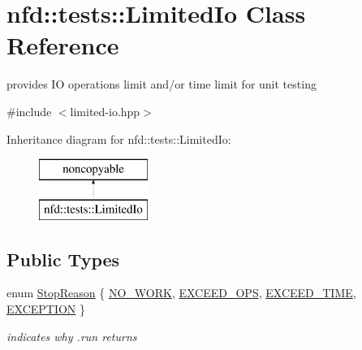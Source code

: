 \hypertarget{classnfd_1_1tests_1_1LimitedIo}{}\section{nfd\+:\+:tests\+:\+:Limited\+Io Class Reference}
\label{classnfd_1_1tests_1_1LimitedIo}


provides IO operations limit and/or time limit for unit testing  




{\ttfamily \#include $<$limited-\/io.\+hpp$>$}

Inheritance diagram for nfd\+:\+:tests\+:\+:Limited\+Io\+:\begin{figure}[H]
\begin{center}
\leavevmode
\includegraphics[height=2.000000cm]{classnfd_1_1tests_1_1LimitedIo}
\end{center}
\end{figure}
\subsection*{Public Types}
\begin{DoxyCompactItemize}
\item 
enum \hyperlink{classnfd_1_1tests_1_1LimitedIo_adbe63f8389fb55a9267d5291c48319c3}{Stop\+Reason} \{ \hyperlink{classnfd_1_1tests_1_1LimitedIo_adbe63f8389fb55a9267d5291c48319c3adba390cf6fd1660870ce5190a7aaf610}{N\+O\+\_\+\+W\+O\+RK}, 
\hyperlink{classnfd_1_1tests_1_1LimitedIo_adbe63f8389fb55a9267d5291c48319c3a8711760959e8bda432c512032054012c}{E\+X\+C\+E\+E\+D\+\_\+\+O\+PS}, 
\hyperlink{classnfd_1_1tests_1_1LimitedIo_adbe63f8389fb55a9267d5291c48319c3ab46a7a46c20f25a2980a518c070f526a}{E\+X\+C\+E\+E\+D\+\_\+\+T\+I\+ME}, 
\hyperlink{classnfd_1_1tests_1_1LimitedIo_adbe63f8389fb55a9267d5291c48319c3a6e956ccf8acf978942ab68d04ddb5deb}{E\+X\+C\+E\+P\+T\+I\+ON}
 \}\begin{DoxyCompactList}\small\item\em indicates why .run returns \end{DoxyCompactList}
\end{DoxyCompactItemize}
